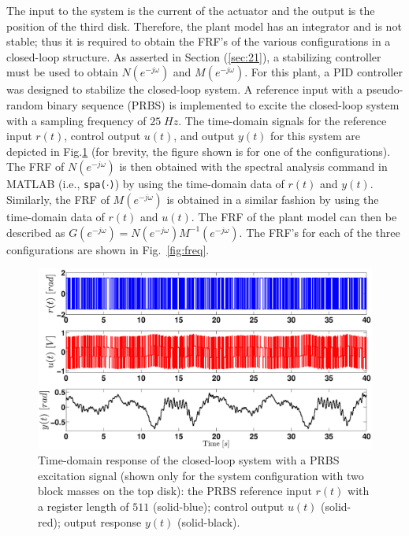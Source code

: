 \documentclass[a4paper, 10pt, conference]{ieeeconf}
\begin{document}
The input to the system is the current of the actuator and the output is the position of the third disk. Therefore, the plant model has an integrator and is not stable; thus it is required to obtain the FRF's of the various configurations in a closed-loop structure. As asserted in Section (\ref{sec:21}), a stabilizing controller must be used to obtain $N(e^{-j\omega})$ and $M(e^{-j\omega})$. For this plant, a PID controller was designed to stabilize the closed-loop system. A reference input with a pseudo-random binary sequence (PRBS) is implemented to excite the closed-loop system with a sampling frequency of $25 \; Hz$. The time-domain signals for the reference input $r(t)$, control output $u(t)$, and output $y(t)$ for this system are depicted in Fig.\ref{fig:iddata} (for brevity, the figure shown is for one of the configurations). The FRF of $N(e^{-j\omega})$ is then obtained with the spectral analysis command in MATLAB (i.e., \texttt{spa($\cdot$)}) by using the time-domain data of $r(t)$ and $y(t)$. Similarly, the FRF of $M(e^{-j\omega})$ is obtained  in a similar fashion by using the time-domain data of $r(t)$ and $u(t)$. The FRF of the plant model can then be described as $G(e^{-j\omega}) = N(e^{-j\omega})M^{-1}(e^{-j\omega})$. The FRF's for each of the three configurations are shown in Fig.~\ref{fig:freq}.
\begin{figure}
\centering
\includegraphics[width=1.1\columnwidth]{pics/id_data_2}
\caption{Time-domain response of the closed-loop system with a PRBS excitation signal (shown only for the system configuration with two block masses on the top disk): the PRBS reference input $r(t)$ with a register length of $511$ (solid-blue); control output $u(t)$ (solid-red); output response $y(t)$ (solid-black).}
\label{fig:iddata}
\end{figure}
\end{document}
